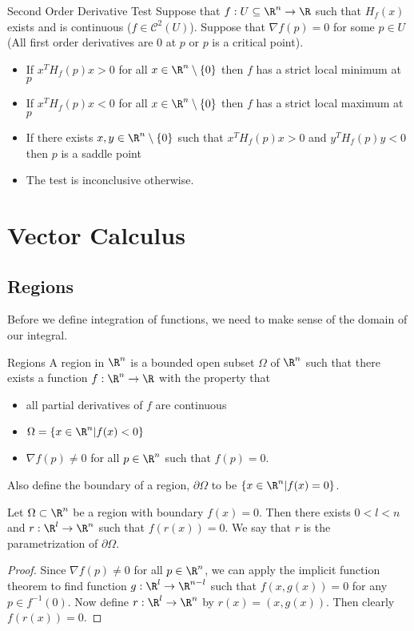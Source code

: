 \documentclass[a4paper]{article}
\begin{document}
\begin{thm}{Second Order Derivative Test}{} Suppose that $f:U\subseteq\R^n\to\R$ such that $H_f(x)$ exists and is continuous ($f\in\mathcal{C}^2(U)$). Suppose that $\nabla f(p)=0$ for some $p\in U$ (All first order derivatives are $0$ at $p$ or $p$ is a critical point). 
\begin{itemize}
\item If $x^TH_f(p)x>0$ for all $x\in\R^n\setminus\{0\}$ then $f$ has a strict local minimum at $p$
\item If $x^TH_f(p)x<0$ for all $x\in\R^n\setminus\{0\}$ then $f$ has a strict local maximum at $p$
\item If there exists $x,y\in\R^n\setminus\{0\}$ such that $x^TH_f(p)x>0$ and $y^TH_f(p)y<0$ then $p$ is a saddle point
\item The test is inconclusive otherwise. 
\end{itemize}
\end{thm}

\pagebreak
\section{Vector Calculus}
\subsection{Regions}
Before we define integration of functions, we need to make sense of the domain of our integral. 

\begin{defn}{Regions}{} A region in $\R^n$ is a bounded open subset $\Omega$ of $\R^n$ such that there exists a function $f:\R^n\to\R$ with the property that 
\begin{itemize}
\item all partial derivatives of $f$ are continuous
\item $\Omega=\{x\in\R^n|f(x)<0\}$
\item $\nabla f(p)\neq 0$ for all $p\in\R^n$ such that $f(p)=0$. 
\end{itemize}
Also define the boundary of a region, $\partial\Omega$ to be $\{x\in\R^n|f(x)=0\}$. 
\end{defn}

\begin{prp}{}{} Let $\Omega\subset\R^n$ be a region with boundary $f(x)=0$. Then there exists $0<l<n$ and $r:\R^l\to\R^n$ such that $f(r(x))=0$. We say that $r$ is the parametrization of $\partial\Omega$. \tcbline
\begin{proof}
Since $\nabla f(p)\neq 0$ for all $p\in\R^n$, we can apply the implicit function theorem to find function $g:\R^l\to\R^{n-l}$ such that $f(x,g(x))=0$ for any $p\in f^{-1}(0)$. Now define $r:\R^l\to\R^n$ by $r(x)=(x,g(x))$. Then clearly $f(r(x))=0$. 
\end{proof}
\end{prp}
\end{document}
